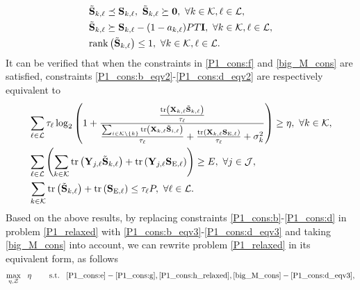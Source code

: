 \documentclass[12pt,draftclsnofoot, onecolumn]{IEEEtran}
\theoremstyle{plain}
\begin{document}
\begin{sloppypar}
\begin{subequations}
\begin{align}
	& \tilde{\mathbf S}_{k,\ell} \preceq \mathbf S_{k,\ell}, \ \tilde{\mathbf S}_{k,\ell} \succeq \mathbf 0, \ \forall k\in\mathcal K, \ell \in\mathcal L, \label{big_M_cons:b}\\
	& \tilde{\mathbf S}_{k,\ell} \succeq \mathbf S_{k,\ell} - (1 - a_{k,\ell})PT\mathbf I, \ \forall k\in\mathcal K, \ell \in\mathcal L, \label{big_M_cons:c}\\
	& {\rm rank}\left(\tilde{\mathbf S}_{k,\ell}\right) \leq 1, \ \forall k\in\mathcal K, \ell \in\mathcal L. \label{big_M_cons:d}
	\end{align}
\end{subequations}
It can be verified that when the constraints in \eqref{P1_cons:f} and \eqref{big_M_cons} are satisfied, constraints \eqref{P1_cons:b_eqv2}-\eqref{P1_cons:d_eqv2} are respectively equivalent to
\begin{align}
& \sum_{\ell\in\mathcal L}\tau_\ell\log_2\left(1 + \frac{\frac{{\rm tr}\left(\mathbf X_{k,\ell}\tilde{\mathbf S}_{k,\ell}\right)}{\tau_\ell}}{\frac{\sum_{i\in \mathcal K\backslash\{k\}}{\rm tr}\left(\mathbf X_{k,\ell}\tilde{\mathbf S}_{i,\ell}\right)}{\tau_\ell} + \frac{{\rm tr}\left(\mathbf X_{k,\ell}\mathbf S_{\mathrm E,\ell}\right)}{\tau_\ell} + \sigma_k^2} \right) \geq \eta, \ \forall k\in\mathcal K, \label{P1_cons:b_eqv3}\\ 
& \sum_{\ell\in\mathcal L}\left(\sum_{k\in\mathcal K}{\rm tr}\left(\mathbf Y_{j,\ell}\tilde{\mathbf S}_{k,\ell}\right) + {\rm tr}\left(\mathbf Y_{j,\ell}\mathbf S_{\mathrm E, \ell} \right) \right) \geq E, \ \forall j\in\mathcal J, \label{P1_cons:c_eqv3}\\
& \sum_{k\in\mathcal K}{\rm tr}\left(\tilde{\mathbf S}_{k,\ell}\right)  + {\rm tr}\left(\mathbf S_{\mathrm E,\ell} \right) \leq \tau_\ell P, \ \forall \ell\in\mathcal L. \label{P1_cons:d_eqv3}
\end{align}
Based on the above results, by replacing constraints \eqref{P1_cons:b}-\eqref{P1_cons:d} in problem \eqref{P1_relaxed} with \eqref{P1_cons:b_eqv3}-\eqref{P1_cons:d_eqv3} and taking \eqref{big_M_cons} into account, we can rewrite problem \eqref{P1_relaxed} in its equivalent form, as follows  
\begin{align}\label{P1_relaxed_eqv}
\underset{\eta, \mathcal Z}{\max} \hspace{3mm} \eta \hspace{8mm}
\text{s.t.} \hspace{3mm}  \eqref{P1_cons:e}-\eqref{P1_cons:g}, \eqref{P1_cons:h_relaxed}, \eqref{big_M_cons}-\eqref{P1_cons:d_eqv3}, 

\end{align}
\end{sloppypar}
\end{document}
